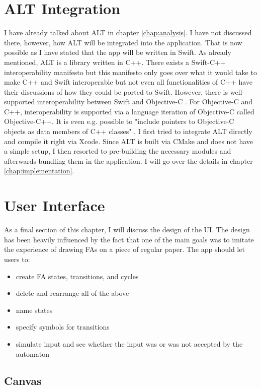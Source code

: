 \section{ALT Integration}

I have already talked about ALT in chapter \ref{chap:analysis}. I have not discussed there, however, how ALT will be integrated into the application. That is now possible as I have stated that the app will be written in Swift. As already mentioned, ALT is a library written in C++. There exists a Swift-C++ interoperability manifesto \cite{swift-c++-manifesto} but this manifesto only goes over what it would take to make C++ and Swift interoperable but not even all functionalities of C++ have their discussions of how they could be ported to Swift. However, there is well-supported interoperability between Swift and Objective-C \cite{swift-objc-interoperability}. For Objective-C and C++, interoperability is supported via a language iteration of Objective-C called Objective-C++. It is even e.g. possible to "include pointers to Objective-C objects as data members of C++ classes" \cite{objc++}. I first tried to integrate ALT directly and compile it right via Xcode. Since ALT is built via CMake \cite{cmake} and does not have a simple setup, I then resorted to pre-building the necessary modules and afterwards bundling them in the application. I will go over the details in chapter \ref{chap:implementation}.

\section{User Interface}

As a final section of this chapter, I will discuss the design of the UI. The design has been heavily influenced by the fact that one of the main goals was to imitate the experience of drawing FAs on a piece of regular paper. The app should let users to:
\begin{itemize}
    \item create FA states, transitions, and cycles
    \item delete and rearrange all of the above
    \item name states
    \item specify symbols for transitions
    \item simulate input and see whether the input was or was not accepted by the automaton
\end{itemize}

\subsection{Canvas}

